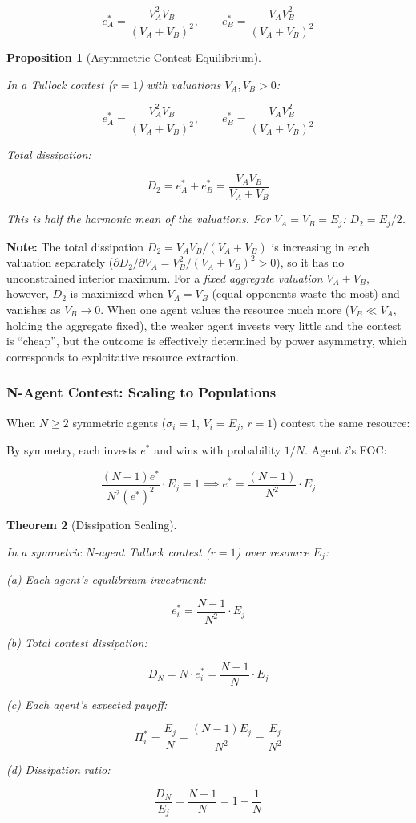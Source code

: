 \documentclass[11pt]{article}
\theoremstyle{plain}
\newtheorem{theorem}{Theorem}
\newtheorem{proposition}[theorem]{Proposition}
\theoremstyle{definition}
\theoremstyle{remark}
\let\origsubsubsection\subsubsection
\renewcommand{\subsubsection}{\needspace{4\baselineskip}\origsubsubsection}
\begin{document}
\[e_A^* = \frac{V_A^2 V_B}{(V_A + V_B)^2}, \qquad e_B^* = \frac{V_A V_B^2}{(V_A + V_B)^2}\]

\begin{proposition}[Asymmetric Contest Equilibrium]
\label{prop-asymmetric-contest}

In a Tullock contest ($r = 1$) with valuations $V_A, V_B > 0$:

$$e_A^* = \frac{V_A^2 V_B}{(V_A + V_B)^2}, \qquad e_B^* = \frac{V_A V_B^2}{(V_A + V_B)^2}$$

Total dissipation:

$$D_2 = e_A^* + e_B^* = \frac{V_A V_B}{V_A + V_B}$$

This is half the harmonic mean of the valuations. For $V_A = V_B = E_j$: $D_2 = E_j/2$.
\end{proposition}

\textbf{Note:} The total dissipation \(D_2 = V_A V_B / (V_A + V_B)\) is
increasing in each valuation separately
(\(\partial D_2/\partial V_A = V_B^2/(V_A+V_B)^2 > 0\)), so it has no
unconstrained interior maximum. For a \emph{fixed aggregate valuation}
\(V_A + V_B\), however, \(D_2\) is maximized when \(V_A = V_B\) (equal
opponents waste the most) and vanishes as \(V_B \to 0\). When one agent
values the resource much more (\(V_B \ll V_A\), holding the aggregate
fixed), the weaker agent invests very little and the contest is
``cheap'', but the outcome is effectively determined by power asymmetry,
which corresponds to exploitative resource extraction.

\subsubsection{N-Agent Contest: Scaling to
Populations}\label{n-agent-contest-scaling-to-populations}

When \(N \geq 2\) symmetric agents (\(\sigma_i = 1\), \(V_i = E_j\),
\(r = 1\)) contest the same resource:

By symmetry, each invests \(e^*\) and wins with probability \(1/N\).
Agent \(i\)'s FOC:

\[\frac{(N-1) e^*}{N^2 (e^*)^2} \cdot E_j = 1 \implies e^* = \frac{(N-1)}{N^2} \cdot E_j\]

\begin{theorem}[Dissipation Scaling]
\label{thm-dissipation-scaling}

In a symmetric $N$-agent Tullock contest ($r = 1$) over resource $E_j$:

(a) Each agent's equilibrium investment:

$$e_i^* = \frac{N - 1}{N^2} \cdot E_j$$

(b) Total contest dissipation:

$$D_N = N \cdot e_i^* = \frac{N - 1}{N} \cdot E_j$$

(c) Each agent's expected payoff:

$$\Pi_i^* = \frac{E_j}{N} - \frac{(N-1) E_j}{N^2} = \frac{E_j}{N^2}$$

(d) Dissipation ratio:

$$\frac{D_N}{E_j} = \frac{N - 1}{N} = 1 - \frac{1}{N}$$
\end{theorem}
\end{document}
